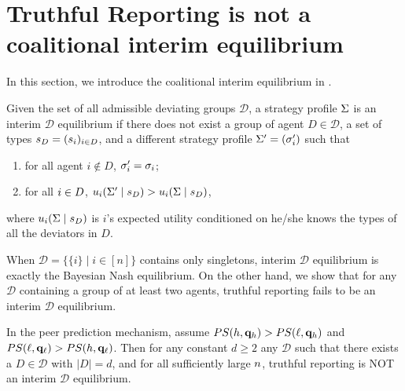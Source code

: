 




\section{Truthful Reporting is not a coalitional interim equilibrium}
\label{apx:guo}

In this section, we introduce the coalitional interim equilibrium in \citep{guo2022robust}.

\begin{definition}
\label{def:interim}
    Given the set of all admissible deviating groups $\mathcal{D}$, a strategy profile $\Sigma$ is an  interim $\mathcal{D}$ equilibrium if there does not exist a group of agent $D \in \mathcal{D}$, a set of types $s_D = (s_i)_{i \in D}$, and a different strategy profile $\Sigma' = (\sigma'_{i})$ such that 
    \begin{enumerate}
    \item for all agent $i \not \in D$, $\sigma'_{i} = \sigma_{i}$; 
    \item for all $i\in D$, $ u_i(\Sigma' \mid s_D) > u_i(\Sigma \mid s_D)$,
\end{enumerate}
where $u_i(\Sigma \mid s_D)$ is $i$'s expected utility conditioned on he/she knows the types of all the deviators in $D$. 
\end{definition}

When $\mathcal{D} = \{\{i\}\mid i \in [n]\}$ contains only singletons, interim $\mathcal{D}$ equilibrium is exactly the Bayesian Nash equilibrium. On the other hand, we show that for any $\mathcal{D}$ containing a group of at least two agents, truthful reporting fails to be an interim $\mathcal{D}$ equilibrium. 

\begin{prop}
    In the peer prediction mechanism, assume $PS(h, \mathbf{q}_h) > PS(\ell, \mathbf{q}_h)$ and $PS(\ell, \mathbf{q}_\ell) > PS(h, \mathbf{q}_\ell)$. Then for any constant $d \ge 2$ any $\mathcal{D}$ such that there exists a $D\in \mathcal{D}$ with $|D|=d$, and for all sufficiently large $n$, truthful reporting is NOT an interim $\mathcal{D}$ equilibrium.
\end{prop}

